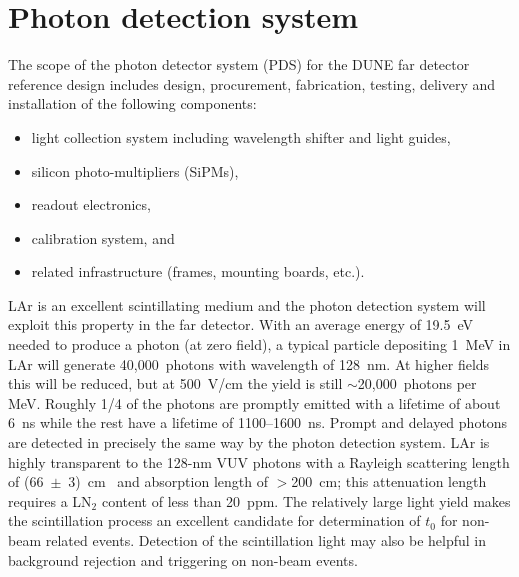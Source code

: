 
\section{Photon detection system}


The scope of the photon detector system (PDS) for the DUNE far detector
reference design includes design, procurement, fabrication,
testing, delivery and installation of the following components:
\begin{itemize}
\item light collection system including wavelength shifter and light guides,
\item silicon photo-multipliers (SiPMs),
\item readout electronics,
\item calibration system, and
\item related infrastructure (frames, mounting boards, etc.).
\end{itemize}


LAr is an excellent scintillating medium and the photon detection
system will exploit this property in the far detector.  With an
average energy of 19.5~eV needed to produce a photon (at zero field),
a typical particle depositing 1~MeV in LAr will generate
40,000~photons with wavelength of 128~nm. At higher fields this will
be reduced, but at 500~V/cm the yield is still $\sim$20,000~photons
per MeV. Roughly 1/4 of the photons are promptly emitted with a
lifetime of about 6~ns while the rest have a lifetime of
1100--1600~ns. Prompt and delayed photons are detected in
  precisely the same way by the photon detection system. LAr is
highly transparent to the 128-nm VUV photons with a Rayleigh
scattering length of (66~$\pm$~3)~cm~\cite{Rayleigh} and absorption
length of $>$200~cm; this attenuation length requires a LN$_2$
  content of less than 20~ppm. The relatively large light yield makes
the scintillation process an excellent candidate for determination of
$t_0$ for non-beam related events. Detection of the scintillation
light may also be helpful in background rejection and triggering on
non-beam events.

